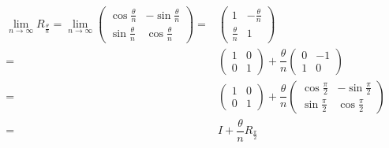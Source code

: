\documentclass[
]{book}
\theoremstyle{definition}
\theoremstyle{definition}
\theoremstyle{definition}
\theoremstyle{definition}
\theoremstyle{remark}
\begin{document}
\[
\begin{aligned}
\lim_{n\rightarrow\infty}R_{{\scriptscriptstyle \frac{\theta}{n}}}=\lim_{n\rightarrow\infty}\begin{pmatrix}\cos\frac{\theta}{n} & -\sin\frac{\theta}{n}\\
\sin\frac{\theta}{n} & \cos\frac{\theta}{n}
\end{pmatrix}= & \begin{pmatrix}1 & -\frac{\theta}{n}\\
\frac{\theta}{n} & 1
\end{pmatrix}\\
= & \begin{pmatrix}1 & 0\\
0 & 1
\end{pmatrix}+\dfrac{\theta}{n}\begin{pmatrix}0 & -1\\
1 & 0
\end{pmatrix}\\
= & \begin{pmatrix}1 & 0\\
0 & 1
\end{pmatrix}+\dfrac{\theta}{n}\begin{pmatrix}\cos\frac{\pi}{2} & -\sin\frac{\pi}{2}\\
\sin\frac{\pi}{2} & \cos\frac{\pi}{2}
\end{pmatrix}\\
= & I+\dfrac{\theta}{n}R_{{\scriptscriptstyle \frac{\pi}{2}}}
\end{aligned}
\]
\end{document}
